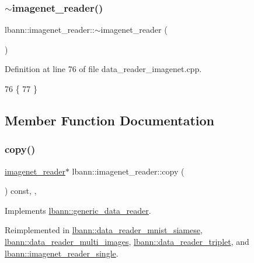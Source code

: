 \subsubsection{\texorpdfstring{$\sim$imagenet\+\_\+reader()}{~imagenet\_reader()}}
{\footnotesize\ttfamily lbann\+::imagenet\+\_\+reader\+::$\sim$imagenet\+\_\+reader (\begin{DoxyParamCaption}{ }\end{DoxyParamCaption})\hspace{0.3cm}{\ttfamily [override]}}



Definition at line 76 of file data\+\_\+reader\+\_\+imagenet.\+cpp.


\begin{DoxyCode}
76                                   \{
77 \}
\end{DoxyCode}


\subsection{Member Function Documentation}
\mbox{\label{classlbann_1_1imagenet__reader_a71be5220be24de5caf00d2e422b750f2}} 
\subsubsection{\texorpdfstring{copy()}{copy()}}
{\footnotesize\ttfamily \hyperlink{classlbann_1_1imagenet__reader}{imagenet\+\_\+reader}$\ast$ lbann\+::imagenet\+\_\+reader\+::copy (\begin{DoxyParamCaption}{ }\end{DoxyParamCaption}) const\hspace{0.3cm}{\ttfamily [inline]}, {\ttfamily [override]}, {\ttfamily [virtual]}}



Implements \hyperlink{classlbann_1_1generic__data__reader_a208ba1223e7aaa75e94b728501f12f86}{lbann\+::generic\+\_\+data\+\_\+reader}.



Reimplemented in \hyperlink{classlbann_1_1data__reader__mnist__siamese_a0b9750c72f9fdb28499b6dfe70bc9a6f}{lbann\+::data\+\_\+reader\+\_\+mnist\+\_\+siamese}, \hyperlink{classlbann_1_1data__reader__multi__images_a46e1b7fab6ac5af4398cb9b5da900a74}{lbann\+::data\+\_\+reader\+\_\+multi\+\_\+images}, \hyperlink{classlbann_1_1data__reader__triplet_aa390c4e801dfa367895ef0904daa0b77}{lbann\+::data\+\_\+reader\+\_\+triplet}, and \hyperlink{classlbann_1_1imagenet__reader__single_ac19ea9ae8887d86ef616099c2d93d699}{lbann\+::imagenet\+\_\+reader\+\_\+single}.



